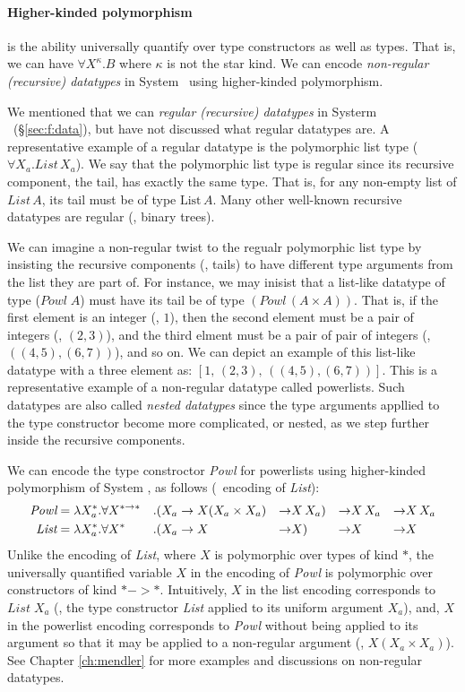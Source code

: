 \paragraph{Higher-kinded polymorphism} is the ability universally quantify
over type constructors as well as types. That is, we can have
$\forall X^\kappa.B$ where $\kappa$ is not the star kind.
We can encode \emph{non-regular (recursive) datatypes} in System \Fw\ using
higher-kinded polymorphism.

We mentioned that we can \emph{regular (recursive) datatypes}
in Systerm \F\ (\S\ref{sec:f:data}), but have not discussed
what regular datatypes are. A representative example of a regular datatype
is the polymorphic list type ($\forall X_a.\textit{List}\,X_a$).
We say that the polymorphic list type is regular since its recursive
component, the tail, has exactly the same type. That is, for any
non-empty list of $\textit{List}\,A$, its tail must be of type $\text{List}\,A$.
Many other well-known recursive datatypes are regular (\eg, binary trees).

We can imagine a non-regular twist to the regualr polymorphic list type
by insisting the recursive components (\ie, tails) to have different
type arguments from the list they are part of. For instance, we may inisist
that a list-like datatype of type ($\textit{Powl}\;A$) must have its tail be
of type $(\textit{Powl}\,(A\times A))$. That is, if the first element is
an integer (\eg, $1$), then the second element must be a pair of integers
(\eg, $(2,3)$), and the third elment must be a pair of pair of integers
(\eg, $((4,5),(6,7))$), and so on. We can depict an example of this list-like
datatype with a three element as: $[1,\,(2,3),\,((4,5),(6,7))]$.
This is a representative example of a non-regular datatype called powerlists.
Such datatypes are also called \emph{nested datatypes} %
since the type arguments appllied to the type constructor become
more complicated, or nested, as we step further inside the recursive components.

We can encode the type constroctor \textit{Powl} for powerlists using
higher-kinded polymorphism of System \Fw, as follows
(\cf\ encoding of \textit{List}):
\begin{align*}
\textit{Powl} &= \lambda X_a^{*}.\forall X^{* -> *}&.&
	(X_a -> X(X_a\times X_a) & -> & X\,X_a) & -> & X\,X_a & -> & X\,X_a \\
\textit{List} &= \lambda X_a^{*}.\forall X^{*}&.&
	(X_a -> X & -> & X) & -> & X & -> & X
\end{align*}
Unlike the encoding of \textit{List}, where $X$ is polymorphic over types
of kind $*$, the universally quantified variable $X$ in the encoding of
\textit{Powl} is polymorphic over constructors of kind $* -> *$.
Intuitively, $X$ in the list encoding corresponds to $\textit{List}\;X_a$
(\ie, the type constructor \textit{List} applied to its uniform argument $X_a$),
and, $X$ in the powerlist encoding corresponds to \textit{Powl} without
being applied to its argument so that it may be applied to a non-regular
argument (\eg, $X(X_a\times X_a)$). See Chapter \ref{ch:mendler} for more
examples and discussions on non-regular datatypes.

